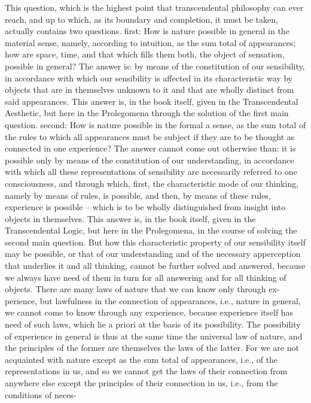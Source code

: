This question, which is the highest point that transcendental philosophy
can ever reach, and up to which, as its boundary and completion, it must
be taken, actually contains two questions.
ﬁrst: How is nature possible in general in the material sense, namely,
according to intuition, as the sum total of appearances; how are space,
time, and that which ﬁlls them both, the object of sensation, possible in
general? The answer is: by means of the constitution of our sensibility,
in accordance with which our sensibility is affected in its characteristic
way by objects that are in themselves unknown to it and that are wholly
distinct from said appearances. This answer is, in the book itself, given
in the Transcendental Aesthetic, but here in the Prolegomena through the
solution of the ﬁrst main question.
second: How is nature possible in the formal a sense, as the sum total
of the rules to which all appearances must be subject if they are to be
thought as connected in one experience? The answer cannot come out
otherwise than: it is possible only by means of the constitution of our
understanding, in accordance with which all these representations of
sensibility are necessarily referred to one consciousness, and through
which, ﬁrst, the characteristic mode of our thinking, namely by means
of rules, is possible, and then, by means of these rules, experience is
possible – which is to be wholly distinguished from insight into objects in
themselves. This answer is, in the book itself, given in the Transcendental
Logic,  but here in the Prolegomena, in the course of solving the second
main question.
But how this characteristic property of our sensibility itself may be
possible, or that of our understanding and of the necessary apperception
that underlies it and all thinking, cannot be further solved and answered,
because we always have need of them in turn for all answering and for
all thinking of objects.
There are many laws of nature that we can know only through ex-
perience, but lawfulness in the connection of appearances, i.e., nature
in general, we cannot come to know through any experience, because
experience itself has need of such laws, which lie a priori at the basis of
its possibility.
The possibility of experience in general is thus at the same time the
universal law of nature, and the principles of the former are themselves
the laws of the latter. For we are not acquainted with nature except as
the sum total of appearances, i.e., of the representations in us, and so we
cannot get the laws of their connection from anywhere else except the
principles of their connection in us, i.e., from the conditions of neces-
